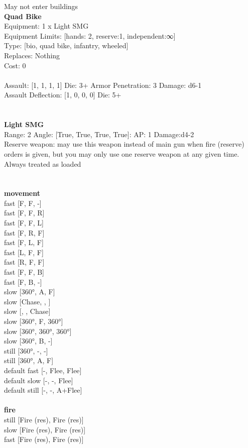 \noindent May not enter buildings\\ 


{\bf Quad Bike } \\
Equipment: 1 x Light SMG \\
Equipment Limits: [hands: 2, reserve:1, independent:∞] \\
Type: [bio, quad bike, infantry, wheeled] \\
Replaces: Nothing \\
Cost: 0\\
\ \\
Assault: [1, 1, 1, 1] Die: 3+ Armor Penetration: 3 Damage: d6-1 \\
Assault Deflection: [1, 0, 0, 0] Die: 5+\\
\indent  
\ \\

\ \\
{\bf Light SMG } \\



Range: 2  Angle: [True, True, True, True]: AP: 1 Damage:d4-2 \\
Reserve weapon: may use this weapon instead of main gun when fire (reserve) orders is given, but you may only use one reserve weapon at any given time.\\ 
Always treated as loaded\\ 




 
\ \\



\ \\ {\bf movement } \\
fast [F, F, -] \\
fast [F, F, R] \\
fast [F, F, L] \\
fast [F, R, F] \\
fast [F, L, F] \\
fast [L, F, F] \\
fast [R, F, F] \\
fast [F, F, B] \\
fast [F, B, -] \\
slow [360°, A, F] \\
slow [Chase, , ] \\
slow [, , Chase] \\
slow [360°, F, 360°] \\
slow [360°, 360°, 360°] \\
slow [360°, B, -] \\
still [360°, -, -] \\
still [360°, A, F] \\
default fast [-, Flee, Flee] \\
default slow [-, -, Flee] \\
default still [-, -, A+Flee] \\
\ \\ {\bf fire } \\
still [Fire (res), Fire (res)] \\
slow [Fire (res), Fire (res)] \\
fast [Fire (res), Fire (res)] \\


